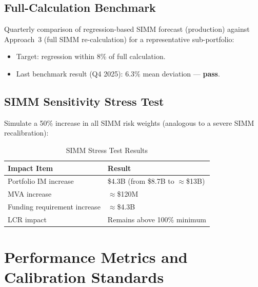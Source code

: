 \documentclass[11pt,a4paper]{article}
\begin{document}
\subsection{Full-Calculation Benchmark}

Quarterly comparison of regression-based SIMM forecast (production) against Approach~3 (full
SIMM re-calculation) for a representative sub-portfolio:
\begin{itemize}[leftmargin=*]
  \item Target: regression within 8\% of full calculation.
  \item Last benchmark result (Q4 2025): 6.3\% mean deviation --- \textbf{pass}.
\end{itemize}

\subsection{SIMM Sensitivity Stress Test}

Simulate a 50\% increase in all SIMM risk weights (analogous to a severe SIMM recalibration):

\begin{table}[h!]
\centering
\caption{SIMM Stress Test Results}
\begin{tabular}{@{}ll@{}}
\toprule
\textbf{Impact Item} & \textbf{Result} \\
\midrule
Portfolio IM increase         & \$4.3B (from \$8.7B to $\approx$\$13B) \\
MVA increase                  & $\approx$\$120M \\
Funding requirement increase  & $\approx$\$4.3B \\
LCR impact                    & Remains above 100\% minimum \\
\bottomrule
\end{tabular}
\end{table}

\section{Performance Metrics and Calibration Standards}
\end{document}
